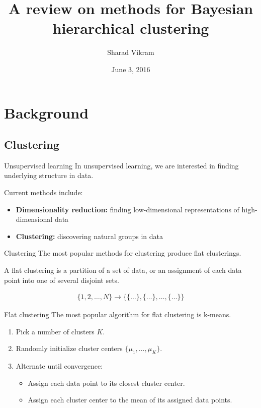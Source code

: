 \documentclass[10pt, compress]{beamer}
\title{A review on methods for Bayesian hierarchical clustering}
\subtitle{}
\date{June 3, 2016}
\author{Sharad Vikram}
\institute{UCSD}
\begin{document}
\maketitle

\section{Background}

\subsection{Clustering}

\begin{frame}{Unsupervised learning}
  In unsupervised learning, we are interested in finding
        underlying structure
        in data.

  \pause
  Current methods include:
  \begin{itemize}
  \pause
    \item \textbf{Dimensionality reduction:} finding low-dimensional
      representations of high-dimensional data
  \pause
    \item \textbf{Clustering:} discovering natural groups
      in data
  \end{itemize}
\end{frame}

\begin{frame}{Clustering}
  The most popular methods for clustering produce
  flat clusterings.

  A \alert{flat clustering} is a partition of a set of data,
  or an assignment of each data point into one of
  several disjoint sets.
  
  \pause

  \begin{align}
    \{1, 2, \ldots, N\} \rightarrow \{\{\ldots\}, \{\ldots\}, \ldots, \{\ldots\}\}
  \end{align}
\end{frame}

\begin{frame}{Flat clustering}
  The most popular algorithm for flat clustering is \alert{k-means}.
  \begin{enumerate}
    \item<2-> Pick a number of clusters $K$.
    \item<3-> Randomly initialize cluster centers $\{\mu_1, \ldots, \mu_K\}$.
    \item<4-> Alternate until convergence:
      \begin{itemize}
        \item Assign each data point to its closest cluster center.
        \item Assign each cluster center to the mean of its assigned data points.
      \end{itemize}
  \end{enumerate}
\end{frame}
\end{document}
